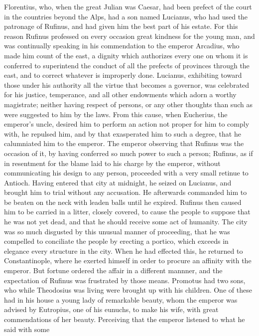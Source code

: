 Florentius, who, when the great Julian was Caesar, had been prefect of the court in the countries beyond the Alps, had a son named Lucianus, who had used the patronage of Rufinus, and had given him the best part of his estate. For this reason Rufinus professed on every occasion great kindness for the young man, and was continually speaking in his commendation to the emperor Arcadius, who made him count of the east, a dignity which authorizes every one on whom it is conferred to superintend the conduct of all the prefects of provinces through the east, and to correct whatever is improperly done. Lucianus, exhibiting toward those under his authority all the virtue that becomes a governor, was celebrated for his justice, temperance, and all other endowments which adorn a worthy magistrate; neither having respect of persons, or any other thoughts than such as were suggested to him by the laws. From this cause, when Eucherius, the emperor's uncle, desired him to perform an action not proper for him to comply with, he repulsed him, and by that exasperated him to such a degree, that he calumniated him to the emperor. The emperor observing that Rufinus was the occasion of it, by having conferred so much power to such a person; Rufinus, as if in resentment for the blame laid to his charge by the emperor, without communicating his design to any person, proceeded with a very small retinue to Antioch. Having entered that city at midnight, he seized on Lucianus, and brought him to trial without any accusation. He afterwards commanded him to be beaten on the neck with leaden balls until he expired. Rufinus then caused him to be carried in a litter, closely covered, to cause the people to suppose that he was not yet dead, and that he should receive some act of humanity. The city was so much disgusted by this unusual manner of proceeding, that he was compelled to conciliate the people by erecting a portico, which exceeds in elegance every structure in the city. When he had effected this, he returned to Constantinople, where he exerted himself in order to procure an affinity with the emperor. But fortune ordered the affair in a different mannner, and the expectation of Rufinus was frustrated by those means. Promotus had two sons, who while Theodosius was living were brought up with his children. One of these had in his house a young lady of remarkable beauty, whom the emperor was advised by Eutropius, one of his eunuchs, to make his wife, with great commendations of her beauty. Perceiving that the emperor listened to what he said with some
